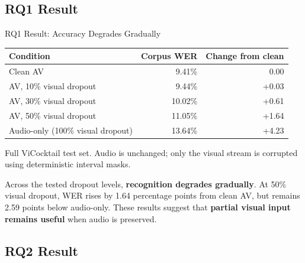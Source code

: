 
\subsection{RQ1 Result}

\begin{frame}{RQ1 Result: Accuracy Degrades Gradually}
  \small
  \centering
  \renewcommand{\arraystretch}{1.25}
  \begin{tabular}{lrr}
    \toprule
    Condition & Corpus WER & Change from clean \\
    \midrule
    Clean AV & 9.41\% & 0.00 \\
    AV, 10\% visual dropout & 9.44\% & +0.03 \\
    AV, 30\% visual dropout & 10.02\% & +0.61 \\
    AV, 50\% visual dropout & 11.05\% & +1.64 \\
    Audio-only (100\% visual dropout) & 13.64\% & +4.23 \\
    \bottomrule
  \end{tabular}
  \vspace{0.12cm}

  {\scriptsize Full ViCocktail test set. Audio is unchanged; only the visual stream is corrupted using deterministic interval masks.}
  \vspace{0.18cm}

  \vspace{0.25cm}
  \begin{minipage}{0.94\textwidth}
    \raggedright
    Across the tested dropout levels, \textbf{recognition degrades gradually}. At 50\% visual dropout, WER rises by 1.64 percentage points from clean AV, but remains 2.59 points below audio-only. These results suggest that \textbf{partial visual input remains useful} when audio is preserved.
  \end{minipage}
  \vspace{0.25cm}

\end{frame}

\subsection{RQ2 Result}

